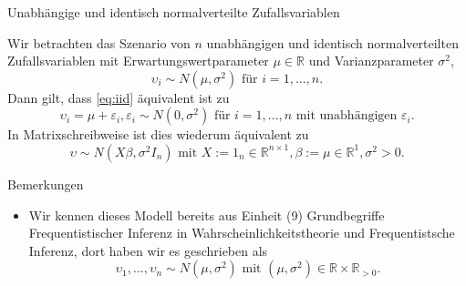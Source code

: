 \documentclass[
  8pt,
  ignorenonframetext,
]{beamer}
\providecommand{\tightlist}{%
  \setlength{\itemsep}{0pt}\setlength{\parskip}{0pt}}
\begin{document}
\begin{frame}{Unabhängige und identisch normalverteilte
Zufallsvariablen}
\protect\hypertarget{unabhuxe4ngige-und-identisch-normalverteilte-zufallsvariablen}{}
\small

Wir betrachten das Szenario von \(n\) unabhängigen und identisch
normalverteilten Zufallsvariablen mit Erwartungswertparameter
\(\mu \in \mathbb{R}\) und Varianzparameter \(\sigma^2\),
\begin{equation}\label{eq:iid}
\upsilon_i \sim N(\mu,\sigma^2) \mbox{ für } i = 1,...,n.
\end{equation} Dann gilt, dass \eqref{eq:iid} äquivalent ist zu
\begin{equation}
\upsilon_i = \mu + \varepsilon_i, \varepsilon_i \sim N(0,\sigma^2) \mbox{ für } i = 1,...,n \mbox{ mit unabhängigen } \varepsilon_i.
\end{equation} In Matrixschreibweise ist dies wiederum äquivalent zu
\begin{equation}
\upsilon \sim N(X\beta,\sigma^2I_n) \mbox{ mit } X := 1_n\in \mathbb{R}^{n \times 1}, \beta := \mu \in \mathbb{R}^1, \sigma^2>0.
\end{equation}

\justifying

Bemerkungen

\begin{itemize}
\tightlist
\item
  \justifying Wir kennen dieses Modell bereits aus Einheit (9)
  Grundbegriffe Frequentistischer Inferenz in Wahrscheinlichkeitstheorie
  und Frequentistsche Inferenz, dort haben wir es geschrieben als
  \begin{equation}
  \upsilon_1,...,\upsilon_n \sim N(\mu,\sigma^2) \mbox{ mit } (\mu,\sigma^2) \in \mathbb{R} \times \mathbb{R}_{>0}.
  \end{equation}
\end{itemize}
\end{frame}
\end{document}
